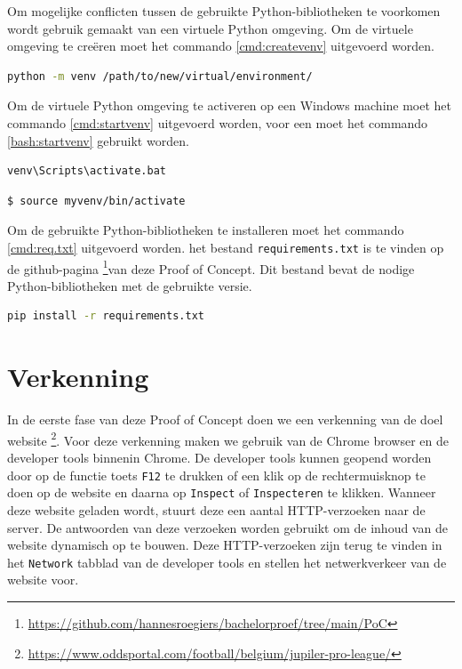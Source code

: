 Om mogelijke conflicten tussen de gebruikte Python-bibliotheken te voorkomen wordt gebruik gemaakt van een virtuele Python omgeving. Om de virtuele omgeving te creëren moet het commando \ref{cmd:createvenv} uitgevoerd worden.

\begin{lstlisting}[language=bash, label={cmd:createvenv}, caption={Het commando om een virtuele Python omgeving te creëren}]
    python -m venv /path/to/new/virtual/environment/
\end{lstlisting}
Om de virtuele Python omgeving te activeren op een Windows machine moet het commando \ref{cmd:startvenv} uitgevoerd worden, voor een moet het commando \ref{bash:startvenv} gebruikt worden.
\begin{lstlisting}[language=bash, label={cmd:startvenv}, caption={Het commando om een virtuele Python omgeving te activeren op een Windows machine}]
    venv\Scripts\activate.bat
\end{lstlisting}

\begin{lstlisting}[language=bash, label={bash:startvenv}, caption={Het commando om een virtuele Python omgeving te activeren op een Linux of MacOS machine}]
    $ source myvenv/bin/activate
\end{lstlisting}

Om de gebruikte Python-bibliotheken te installeren moet het commando \ref{cmd:req.txt} uitgevoerd worden. het bestand \texttt{requirements.txt} is te vinden op de github-pagina \footnote{\url{https://github.com/hannesroegiers/bachelorproef/tree/main/PoC}}van deze Proof of Concept. Dit bestand bevat de nodige Python-bibliotheken met de gebruikte versie.
\begin{lstlisting}[language=bash, label={cmd:req.txt}, caption={Het commando om de nodige Python-bibliotheken te installeren}]
    pip install -r requirements.txt
\end{lstlisting}

\section{Verkenning}
In de eerste fase van deze Proof of Concept doen we een verkenning van de doel website \footnote{\url{https://www.oddsportal.com/football/belgium/jupiler-pro-league/}}.
Voor deze verkenning maken we gebruik van de Chrome browser en de developer tools binnenin Chrome. De developer tools kunnen geopend worden door op de functie toets \texttt{F12} te drukken of een klik op de rechtermuisknop te doen op de website en daarna op \texttt{Inspect} of \texttt{Inspecteren} te klikken. Wanneer deze website geladen wordt, stuurt deze een aantal HTTP-verzoeken naar de server. De antwoorden van deze verzoeken worden gebruikt om de inhoud van de website dynamisch op te bouwen. Deze HTTP-verzoeken zijn terug te vinden in het \texttt{Network} tabblad van de developer tools en stellen het netwerkverkeer van de website voor.

